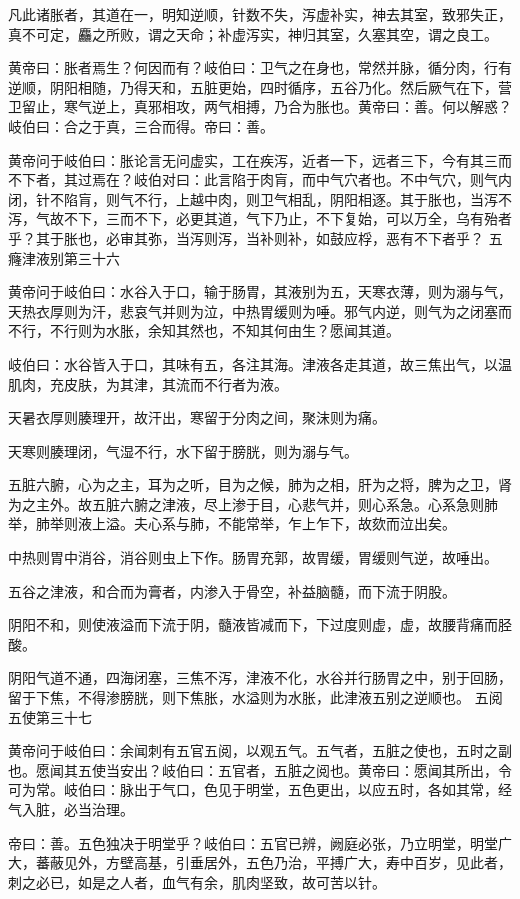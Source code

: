 \documentclass[a4paper,12pt,UTF8,twoside]{ctexbook}
\begin{document}
	凡此诸胀者，其道在一，明知逆顺，针数不失，泻虚补实，神去其室，致邪失正，真不可定，麤之所败，谓之天命；补虚泻实，神归其室，久塞其空，谓之良工。
	
	黄帝曰：胀者焉生？何因而有？岐伯曰：卫气之在身也，常然并脉，循分肉，行有逆顺，阴阳相随，乃得天和，五脏更始，四时循序，五谷乃化。然后厥气在下，营卫留止，寒气逆上，真邪相攻，两气相搏，乃合为胀也。黄帝曰：善。何以解惑？岐伯曰：合之于真，三合而得。帝曰：善。
	
	黄帝问于岐伯曰：胀论言无问虚实，工在疾泻，近者一下，远者三下，今有其三而不下者，其过焉在？岐伯对曰：此言陷于肉肓，而中气穴者也。不中气穴，则气内闭，针不陷肓，则气不行，上越中肉，则卫气相乱，阴阳相逐。其于胀也，当泻不泻，气故不下，三而不下，必更其道，气下乃止，不下复始，可以万全，乌有殆者乎？其于胀也，必审其弥，当泻则泻，当补则补，如鼓应桴，恶有不下者乎？
	五癃津液别第三十六
	
	黄帝问于岐伯曰：水谷入于口，输于肠胃，其液别为五，天寒衣薄，则为溺与气，天热衣厚则为汗，悲哀气并则为泣，中热胃缓则为唾。邪气内逆，则气为之闭塞而不行，不行则为水胀，余知其然也，不知其何由生？愿闻其道。
	
	岐伯曰：水谷皆入于口，其味有五，各注其海。津液各走其道，故三焦出气，以温肌肉，充皮肤，为其津，其流而不行者为液。
	
	天暑衣厚则腠理开，故汗出，寒留于分肉之间，聚沫则为痛。
	
	天寒则腠理闭，气湿不行，水下留于膀胱，则为溺与气。
	
	五脏六腑，心为之主，耳为之听，目为之候，肺为之相，肝为之将，脾为之卫，肾为之主外。故五脏六腑之津液，尽上渗于目，心悲气并，则心系急。心系急则肺举，肺举则液上溢。夫心系与肺，不能常举，乍上乍下，故欬而泣出矣。
	
	中热则胃中消谷，消谷则虫上下作。肠胃充郭，故胃缓，胃缓则气逆，故唾出。
	
	五谷之津液，和合而为膏者，内渗入于骨空，补益脑髓，而下流于阴股。
	
	阴阳不和，则使液溢而下流于阴，髓液皆减而下，下过度则虚，虚，故腰背痛而胫酸。
	
	阴阳气道不通，四海闭塞，三焦不泻，津液不化，水谷并行肠胃之中，别于回肠，留于下焦，不得渗膀胱，则下焦胀，水溢则为水胀，此津液五别之逆顺也。
	五阅五使第三十七
	
	黄帝问于岐伯曰：余闻刺有五官五阅，以观五气。五气者，五脏之使也，五时之副也。愿闻其五使当安出？岐伯曰：五官者，五脏之阅也。黄帝曰：愿闻其所出，令可为常。岐伯曰：脉出于气口，色见于明堂，五色更出，以应五时，各如其常，经气入脏，必当治理。
	
	帝曰：善。五色独决于明堂乎？岐伯曰：五官已辨，阙庭必张，乃立明堂，明堂广大，蕃蔽见外，方壁高基，引垂居外，五色乃治，平搏广大，寿中百岁，见此者，刺之必已，如是之人者，血气有余，肌肉坚致，故可苦以针。
	
\end{document}
